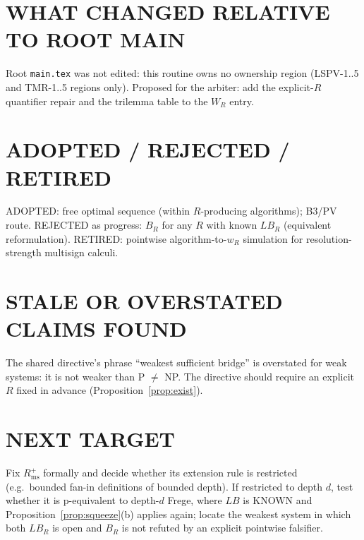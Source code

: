\documentclass[11pt]{article}
\begin{document}
\section*{WHAT CHANGED RELATIVE TO ROOT MAIN}
Root \texttt{main.tex} was not edited: this routine owns no ownership region (LSPV-1..5 and TMR-1..5 regions only).
Proposed for the arbiter: add the explicit-$R$ quantifier repair and the trilemma table to the $W_R$ entry.
\section*{ADOPTED / REJECTED / RETIRED}
ADOPTED: free optimal sequence (within $R$-producing algorithms); B3/PV route. REJECTED as progress:
$B_R$ for any $R$ with known $LB_R$ (equivalent reformulation). RETIRED: pointwise algorithm-to-$w_R$
simulation for resolution-strength multisign calculi.
\section*{STALE OR OVERSTATED CLAIMS FOUND}
The shared directive's phrase ``weakest sufficient bridge'' is overstated for weak systems: it is not weaker than
P $\neq$ NP. The directive should require an explicit $R$ fixed in advance (Proposition~\ref{prop:exist}).
\section*{NEXT TARGET}
Fix $R^+_{\mathrm{ms}}$ formally and decide whether its extension rule is restricted (e.g.\ bounded fan-in
definitions of bounded depth). If restricted to depth $d$, test whether it is p-equivalent to depth-$d$ Frege,
where $LB$ is KNOWN and Proposition~\ref{prop:squeeze}(b) applies again; locate the weakest system in which
both $LB_R$ is open and $B_R$ is not refuted by an explicit pointwise falsifier.
\end{document}
